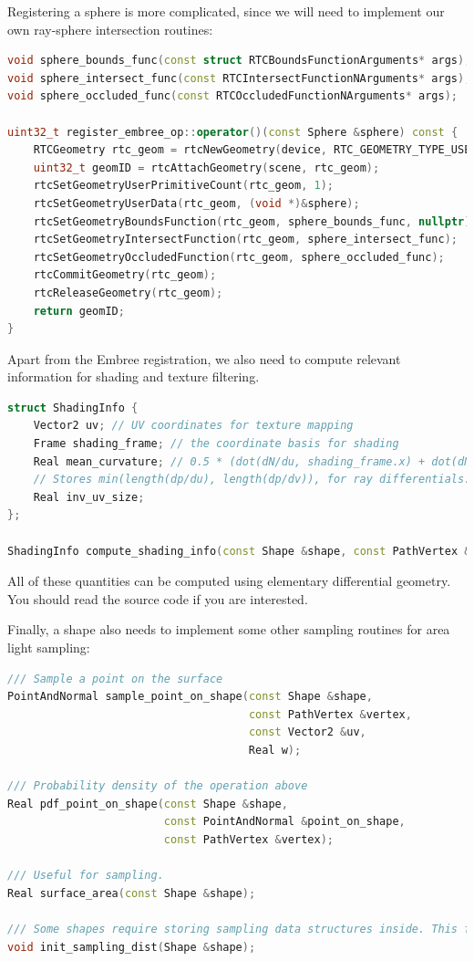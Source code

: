 Registering a sphere is more complicated, since we will need to implement our own ray-sphere intersection routines:
\begin{lstlisting}[language=c++]
void sphere_bounds_func(const struct RTCBoundsFunctionArguments* args);
void sphere_intersect_func(const RTCIntersectFunctionNArguments* args);
void sphere_occluded_func(const RTCOccludedFunctionNArguments* args);

uint32_t register_embree_op::operator()(const Sphere &sphere) const {
    RTCGeometry rtc_geom = rtcNewGeometry(device, RTC_GEOMETRY_TYPE_USER);
    uint32_t geomID = rtcAttachGeometry(scene, rtc_geom);
    rtcSetGeometryUserPrimitiveCount(rtc_geom, 1);
    rtcSetGeometryUserData(rtc_geom, (void *)&sphere);
    rtcSetGeometryBoundsFunction(rtc_geom, sphere_bounds_func, nullptr);
    rtcSetGeometryIntersectFunction(rtc_geom, sphere_intersect_func);
    rtcSetGeometryOccludedFunction(rtc_geom, sphere_occluded_func);
    rtcCommitGeometry(rtc_geom);
    rtcReleaseGeometry(rtc_geom);
    return geomID;
}
\end{lstlisting}

Apart from the Embree registration, we also need to compute relevant information for shading and texture filtering.
\begin{lstlisting}[language=c++]
struct ShadingInfo {
    Vector2 uv; // UV coordinates for texture mapping
    Frame shading_frame; // the coordinate basis for shading
    Real mean_curvature; // 0.5 * (dot(dN/du, shading_frame.x) + dot(dN/dv, shading_frame.y))
    // Stores min(length(dp/du), length(dp/dv)), for ray differentials.
    Real inv_uv_size;
};

ShadingInfo compute_shading_info(const Shape &shape, const PathVertex &vertex);
\end{lstlisting}
All of these quantities can be computed using elementary differential geometry. You should read the source code if you are interested.

Finally, a shape also needs to implement some other sampling routines for area light sampling:
\begin{lstlisting}[language=c++]
/// Sample a point on the surface
PointAndNormal sample_point_on_shape(const Shape &shape,
                                     const PathVertex &vertex,
                                     const Vector2 &uv,
                                     Real w);

/// Probability density of the operation above
Real pdf_point_on_shape(const Shape &shape,
                        const PointAndNormal &point_on_shape,
                        const PathVertex &vertex);

/// Useful for sampling.
Real surface_area(const Shape &shape);

/// Some shapes require storing sampling data structures inside. This function initialize them.
void init_sampling_dist(Shape &shape);
\end{lstlisting}

